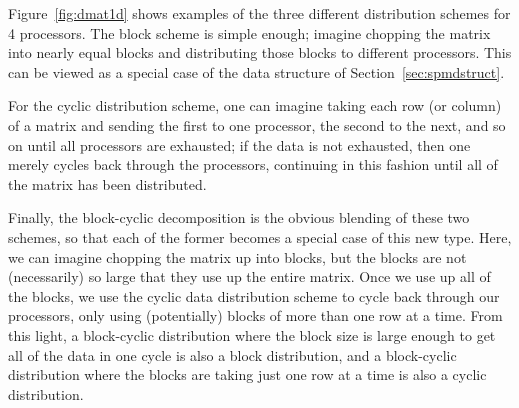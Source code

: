 Figure~\ref{fig:dmat1d} shows examples of the three different distribution schemes for 4 processors.  The block scheme is simple enough; imagine chopping the matrix into nearly equal blocks and distributing those blocks to different processors.  This can be viewed as a special case of the  data structure of Section~\ref{sec:spmdstruct}.  

For the cyclic distribution scheme, one can imagine taking each row (or column) of a matrix and sending the first to one processor, the second to the next, and so on until all processors are exhausted; if the data is not exhausted, then one merely cycles back through the processors, continuing in this fashion until all of the matrix has been distributed.

Finally, the block-cyclic decomposition is the obvious blending of these two schemes, so that each of the former becomes a special case of this new type.  Here, we can imagine chopping the matrix up into blocks, but the blocks are not (necessarily) so large that they use up the entire matrix.  Once we use up all of the blocks, we use the cyclic data distribution scheme to cycle back through our processors, only using (potentially) blocks of more than one row at a time.  From this light, a block-cyclic distribution where the block size is large enough to get all of the data in one cycle is also a block distribution, and a block-cyclic distribution where the blocks are taking just one row at a time is also a cyclic distribution.

